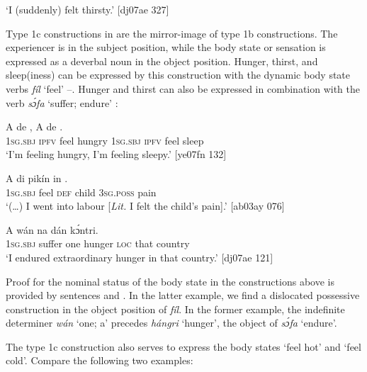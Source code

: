 \glt ‘I (suddenly) felt thirsty.’ [dj07ae 327]
\z

Type 1c constructions in  are the mirror-image of type 1b constructions. The experiencer is in the subject position, while the body state or sensation is expressed as a deverbal noun in the object position. Hunger, thirst, and sleep(iness) can be expressed by this construction with the dynamic body state verbs \textit{fíl} ‘feel’ –. Hunger and thirst can also be expressed in combination with the verb \textit{sɔ́fa} ‘suffer; endure’ :


\ea%
    \label{ex:key:1255}
    \gll A    de    ,  A    de    .\\
\textsc{1sg.sbj}  \textsc{ipfv}  feel  hungry  \textsc{1sg.sbj}  \textsc{ipfv}  feel  sleep\\

\glt ‘I’m feeling hungry, I’m feeling sleepy.’ [ye07fn 132]
\z


\ea%
    \label{ex:key:1256}
    \gll A      di  pikín  in    .\\
\textsc{1sg.sbj}  feel  \textsc{def}  child  \textsc{3sg.poss}  pain\\

\glt ‘(…) I went into labour [\textit{Lit.} I felt the child’s pain].’ [ab03ay 076]
\z


\ea%
    \label{ex:key:1257}
    \gll A        wán      na  dán  kɔ́ntri. \\
\textsc{1sg.sbj}  suffer  one    hunger  \textsc{loc}  that  country\\

\glt ‘I endured extraordinary hunger in that country.’ [dj07ae 121]
\z

Proof for the nominal status of the body state in the constructions above is provided by sentences  and . In the latter example, we find a dislocated possessive construction in the object position of \textit{fíl}. In the former example, the indefinite determiner \textit{wán} ‘one; a’ precedes \textit{hángri} ‘hunger’, the object of \textit{sɔ́fa} ‘endure’.


The type 1c construction also serves to express the body states ‘feel hot’ and ‘feel cold’. Compare the following two examples:



